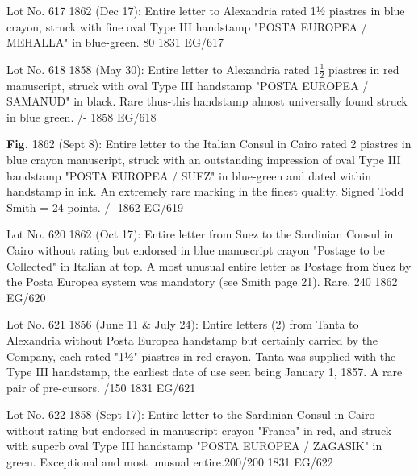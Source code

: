 \documentclass[justified]{tufte-book}
\begin{document}
%
{Lot No. 617
1862 (Dec 17): Entire letter to Alexandria rated 1½ piastres in blue crayon, struck with fine oval Type III handstamp "POSTA EUROPEA / MEHALLA" in blue-green. 80  }%
{1831}%
{EG/617}%
{}%
{}
{}%
{}


%
{
Lot No. 618
1858 (May 30): Entire letter to Alexandria rated $1\frac{1}{2}$ piastres in red manuscript, struck with oval Type III handstamp "POSTA EUROPEA / SAMANUD" in black. Rare thus-this handstamp almost universally found struck in blue green. 
  /-   
}%
{1858}%
{EG/618}%
{}%
{}
{}%
{}

%
{
\textbf{Fig.}
1862 (Sept 8): Entire letter to the Italian Consul in Cairo rated 2 piastres in blue crayon manuscript, struck with an outstanding impression of oval Type III handstamp "POSTA EUROPEA / SUEZ" in blue-green and dated within handstamp in ink. An extremely rare marking in the finest quality. Signed Todd Smith = 24 points. 
/-  
}%
{1862}%
{EG/619}%
{}%
{}
{}%
{}

%
{Lot No. 620
1862 (Oct 17): Entire letter from Suez to the Sardinian Consul in Cairo without rating but endorsed in blue manuscript crayon "Postage to be Collected" in Italian at top. A most unusual entire letter as Postage from Suez by the Posta Europea system was mandatory (see Smith page 21). Rare. 240  }%
{1862}%
{EG/620}%
{}%
{}
{}%
{}

%
{Lot No. 621
1856 (June 11 \& July 24): Entire letters (2) from Tanta to Alexandria without Posta Europea handstamp but certainly carried by the Company, each rated "1½" piastres in red crayon. Tanta was supplied with the Type III handstamp, the earliest date of use seen being January 1, 1857. A rare pair of pre-cursors.
/150  }%
{1831}%
{EG/621}%
{}%
{}
{}%
{}

%
{Lot No. 622
1858 (Sept 17): Entire letter to the Sardinian Consul in Cairo without rating but endorsed in manuscript crayon "Franca" in red, and struck with superb oval Type III handstamp "POSTA EUROPEA / ZAGASIK" in green. Exceptional and most unusual entire.200/200 
}%
{1831}%
{EG/622}%
{}%
{}
{}%
{}
\end{document}
